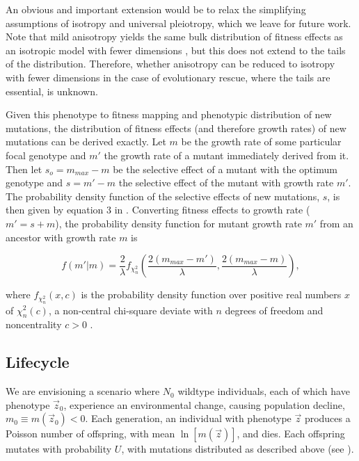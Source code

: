 \documentclass[9pt,twocolumn,twoside,lineno]{gsajnl}
\begin{document}
An obvious and important extension would be to relax the simplifying assumptions of isotropy and universal pleiotropy, which we leave for future work.
Note that mild anisotropy yields the same bulk distribution of fitness effects as an isotropic model with fewer dimensions \citep{Martin2006}, but this does not extend to the tails of the distribution. 
Therefore, whether anisotropy can be reduced to isotropy with fewer dimensions in the case of evolutionary rescue, where the tails are essential, is unknown.

Given this phenotype to fitness mapping and phenotypic distribution of new mutations, the distribution of fitness effects (and therefore growth rates) of new mutations can be derived exactly. 
Let $m$ be the growth rate of some particular focal genotype and $m'$ the growth rate of a mutant immediately derived from it.
Then let $s_o = m_{max} - m$ be the selective effect of a mutant with the optimum genotype and $s = m' - m$ the selective effect of the mutant with growth rate $m'$.
The probability density function of the selective effects of new mutations, $s$, is then given by equation 3 in \cite{Martin2015}.
Converting fitness effects to growth rate ($m'=s+m$), the probability density function for mutant growth rate $m'$ from an ancestor with growth rate $m$ is \cite[cf.\ equation 2 in][]{Anciaux2018}

\begin{equation}\label{eq:fm}
f(m' | m) = \frac{2}{\lambda} f_{\chi_n^2} \left( \frac{2(m_{max} - m')}{\lambda}, \frac{2(m_{max}-m)}{\lambda} \right),
\end{equation}

\noindent where $f_{\chi_n^2}(x, c)$ is the probability density function over positive real numbers $x$ of $\chi_n^2(c)$, a non-central chi-square deviate with $n$ degrees of freedom and noncentrality $c>0$ \citep[equation 26.4.25 in][]{Abramowitz1972}.

\subsection{Lifecycle}

We are envisioning a scenario where $N_0$ wildtype individuals, each of which have phenotype $\vec{z}_0$, experience an environmental change, causing population decline, $m_0\equiv m(\vec{z}_0)<0$.
Each generation, an individual with phenotype $\vec{z}$ produces a Poisson number of offspring, with mean $\ln[m(\vec{z})]$, and dies.
Each offspring mutates with probability $U$, with mutations distributed as described above (see ).
\end{document}
